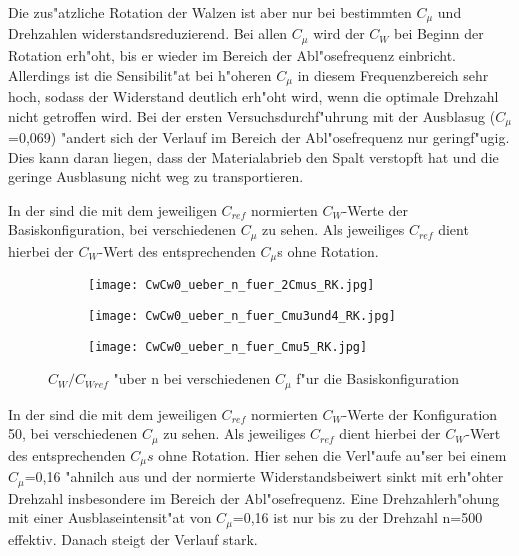 Die zus"atzliche Rotation der Walzen ist aber nur bei bestimmten $C_{\mu}$ und Drehzahlen widerstandsreduzierend. Bei allen $C_{\mu}$ wird der $C_{W}$ bei Beginn der Rotation erh"oht, bis er wieder im Bereich der Abl"osefrequenz einbricht. Allerdings ist die Sensibilit"at bei h"oheren $C_{\mu}$ in diesem Frequenzbereich sehr hoch, sodass der Widerstand deutlich erh"oht wird, wenn die optimale Drehzahl nicht getroffen wird. 
Bei der ersten Versuchsdurchf"uhrung mit der Ausblasug ($C_{\mu}$=0,069) "andert sich der Verlauf im Bereich der Abl"osefrequenz nur geringf"ugig. Dies kann daran liegen, dass der Materialabrieb den Spalt verstopft hat und die geringe Ausblasung nicht weg zu transportieren.


In der  sind die mit dem jeweiligen $C_{ref}$ normierten $C_{W}$-Werte der Basiskonfiguration, bei verschiedenen $C_{\mu}$ zu sehen.
Als jeweiliges $C_{ref}$ dient hierbei der $C_{W}$-Wert des entsprechenden $C_{\mu}$s ohne Rotation.


\begin{figure}[h]
	\centering
	\begin{subfigure}[c]{0.45\textwidth}		
		\texttt{[image: CwCw0\_ueber\_n\_fuer\_2Cmus\_RK.jpg]}
	\end{subfigure}
	\begin{subfigure}[c]{0.45\textwidth}
		\texttt{[image: CwCw0\_ueber\_n\_fuer\_Cmu3und4\_RK.jpg]}
	\end{subfigure}
	\begin{subfigure}[c]{0.45\textwidth}
		\texttt{[image: CwCw0\_ueber\_n\_fuer\_Cmu5\_RK.jpg]}
	\end{subfigure}
	\caption{$C_{W}/C_{Wref}$ "uber n bei verschiedenen $C_{\mu}$ f"ur die Basiskonfiguration}
	\label{fig:CwCwref/n Cmu RK}
\end{figure}

In der  sind die mit dem jeweiligen $C_{ref}$ normierten $C_{W}$-Werte der Konfiguration 50, bei verschiedenen $C_{\mu}$ zu sehen.
Als jeweiliges $C_{ref}$ dient hierbei der $C_{W}$-Wert des entsprechenden $C_{\mu}s$ ohne Rotation.
Hier sehen die Verl"aufe au"ser bei einem $C_{\mu}$=0,16 "ahnilch aus und der normierte Widerstandsbeiwert sinkt mit erh"ohter Drehzahl insbesondere im Bereich der Abl"osefrequenz. 
Eine Drehzahlerh"ohung mit einer Ausblaseintensit"at von $C_{\mu}$=0,16 ist nur bis zu der Drehzahl n=500 effektiv. Danach steigt der Verlauf stark.

